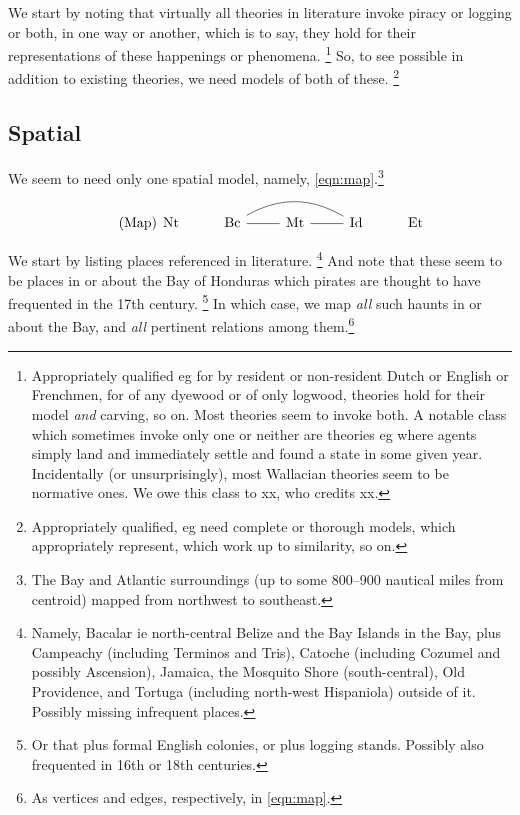 	We start by noting that virtually all theories in literature invoke piracy or logging or both, in one way or another, which is to say, they hold for their representations of these happenings or phenomena.%
	\footnote{Appropriately qualified eg for  by resident or non-resident Dutch or English or Frenchmen, for  of any dyewood or of only logwood, theories hold for their model \emph{and} carving, so on. Most theories seem to invoke both. A notable class which sometimes invoke only one or neither are  theories eg where agents simply land and immediately settle and found a state in some given year. Incidentally (or unsurprisingly), most Wallacian theories seem to be normative ones. We owe this class to xx, who credits xx.}
	So, to see possible in addition to existing theories, we need models of both of these.%
	\footnote{Appropriately qualified, eg need complete or thorough models, which appropriately represent, which work up to similarity, so on.}
	\subsection{Spatial}
	\label{ss:spatial}
		We seem to need only one spatial model, namely, \ref{eqn:map}.\footnote{The Bay and Atlantic surroundings (up to some 800--900 nautical miles from centroid) mapped from northwest to southeast.}
		\begin{equation}
		\tag{Map}
		\label{eqn:map}
		\begin{tikzcd}[arrows=dash]
		\nt &\bc \rar \ar[rr,bend left] &\mt \rar &\id &\et
		\end{tikzcd}
		\end{equation}
	
		We start by listing places referenced in literature.%
		\footnote{Namely, Bacalar ie north-central Belize and the Bay Islands in the Bay, plus Campeachy (including Terminos and Tris), Catoche (including Cozumel and possibly Ascension), Jamaica, the Mosquito Shore (south-central), Old Providence, and Tortuga (including north-west Hispaniola) outside of it. Possibly missing infrequent places.}
		And note that these seem to be places in or about the Bay of Honduras which pirates are thought to have frequented in the 17th century.%
		\footnote{Or that plus formal English colonies, or plus logging stands. Possibly also frequented in 16th or 18th centuries.}
		In which case, we map \emph{all} such haunts in or about the Bay, and \emph{all} pertinent relations among them.\footnote{As vertices and edges, respectively, in \ref{eqn:map}.}
	

